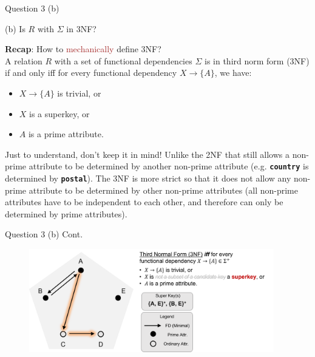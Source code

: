 \begin{frame}[fragile]{Question 3 (b)}

(b) Is $R$ with $\Sigma$ in 3NF?\\\vspace{10pt}

\textbf{Recap}: How to \textcolor{brown}{mechanically} define 3NF?\\\vspace{10pt}
A relation $R$ with a set of functional dependencies $\Sigma$ is in third norm form (3NF) if and only iff for every functional dependency $X\rightarrow\{A\}$, we have:
\begin{itemize}
	\item $X\rightarrow\{A\}$ is trivial, or
	\item $X$ is a superkey, or
	\item $A$ is a prime attribute.
\end{itemize}\vspace{5pt}

\begin{alertblock}{Just to understand, don't keep it in mind!}
	Unlike the 2NF that still allows a non-prime attribute to be determined by another non-prime attribute (e.g. \texttt{\textbf{country}} is determined by \texttt{\textbf{postal}}). 
	The 3NF is more strict so that it does not allow any non-prime attribute to be determined by other non-prime attributes (all non-prime attributes have to be independent to each other, and therefore can only be determined by prime attributes).
\end{alertblock}

\end{frame}

\begin{frame}[fragile]{Question 3 (b) Cont.}
\begin{figure}
	\includegraphics[width=0.95\textwidth, trim=0 0 0 0, clip]{t5/images/q3_3nf_highlight.png}
\end{figure}
\end{frame}

